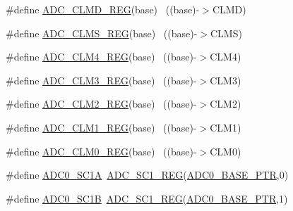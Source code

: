 \begin{DoxyCompactItemize}
\#define \hyperlink{group___a_d_c___register___accessor___macros_ga42b9eb64ac35d5b5dafcdf46cdaa5da6}{A\+D\+C\+\_\+\+C\+L\+M\+D\+\_\+\+R\+EG}(base)                                          ~((base)-\/$>$C\+L\+MD)
\item 
\#define \hyperlink{group___a_d_c___register___accessor___macros_gaebae30a3ca641d11bf4827c16cf97f40}{A\+D\+C\+\_\+\+C\+L\+M\+S\+\_\+\+R\+EG}(base)                                          ~((base)-\/$>$C\+L\+MS)
\item 
\#define \hyperlink{group___a_d_c___register___accessor___macros_ga9c3a854d793a88e2311f1f03b687e3e0}{A\+D\+C\+\_\+\+C\+L\+M4\+\_\+\+R\+EG}(base)                                          ~((base)-\/$>$C\+L\+M4)
\item 
\#define \hyperlink{group___a_d_c___register___accessor___macros_ga97002f7666f0790f47fc6bd12a083246}{A\+D\+C\+\_\+\+C\+L\+M3\+\_\+\+R\+EG}(base)                                          ~((base)-\/$>$C\+L\+M3)
\item 
\#define \hyperlink{group___a_d_c___register___accessor___macros_ga46547eb78fef1573713d39b1d8c578d5}{A\+D\+C\+\_\+\+C\+L\+M2\+\_\+\+R\+EG}(base)                                          ~((base)-\/$>$C\+L\+M2)
\item 
\#define \hyperlink{group___a_d_c___register___accessor___macros_gac5ca17b6333853551a5367159766f482}{A\+D\+C\+\_\+\+C\+L\+M1\+\_\+\+R\+EG}(base)                                          ~((base)-\/$>$C\+L\+M1)
\item 
\#define \hyperlink{group___a_d_c___register___accessor___macros_ga8d8e7a000934e8d6f37a0e6f8175de9e}{A\+D\+C\+\_\+\+C\+L\+M0\+\_\+\+R\+EG}(base)                                          ~((base)-\/$>$C\+L\+M0)
\item 
\#define \hyperlink{group___a_d_c___register___accessor___macros_ga4ec61cea717b410cadc80c71f4c81664}{A\+D\+C0\+\_\+\+S\+C1A}~\hyperlink{group___a_d_c___register___accessor___macros_ga222b4f9dbc62d3e7cdc7fab81d736b1f}{A\+D\+C\+\_\+\+S\+C1\+\_\+\+R\+EG}(\hyperlink{group___a_d_c___peripheral_ga6cec2f227a3a37a9fccaa830740f1f5e}{A\+D\+C0\+\_\+\+B\+A\+S\+E\+\_\+\+P\+TR},0)
\item 
\#define \hyperlink{group___a_d_c___register___accessor___macros_ga9a83b6b66f4db147b1c3f952e62b57d5}{A\+D\+C0\+\_\+\+S\+C1B}~\hyperlink{group___a_d_c___register___accessor___macros_ga222b4f9dbc62d3e7cdc7fab81d736b1f}{A\+D\+C\+\_\+\+S\+C1\+\_\+\+R\+EG}(\hyperlink{group___a_d_c___peripheral_ga6cec2f227a3a37a9fccaa830740f1f5e}{A\+D\+C0\+\_\+\+B\+A\+S\+E\+\_\+\+P\+TR},1)
\item 

\end{DoxyCompactItemize}
